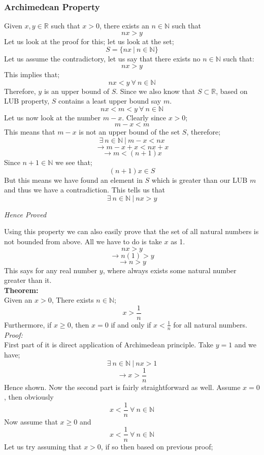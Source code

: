 \documentclass[english,course]{lecture}
\begin{document}
\subsubsection{Archimedean Property}
Given $x,y \in \mathbb{R}$ such that $x > 0$, there exists an $n \in \mathbb{N}$ such that 
$$ nx > y $$
Let us look at the proof for this; let us look at the set;
$$ S = \lbrace nx \ | \ n \in \mathbb{N} \rbrace $$
Let us assume the contradictory, let us say that there exists no $n \in \mathbb{N}$ such that:
$$ nx > y $$
This implies that;
$$ nx < y \ \forall \ n \in \mathbb{N} $$
Therefore, $y$ is an upper bound of $S$. Since we also know that $S \subset \mathbb{R}$, based on LUB property, $S$ contains a least upper bound say $m$.
$$ nx < m < y \ \forall \ n \in \mathbb{N} $$
Let us now look at the number $m-x$. Clearly since $x>0$;
$$ m-x < m $$
This means that $m-x$ is not an upper bound of the set $S$, therefore;
$$ \exists \ n \in \mathbb{N} \ | \ m-x < nx $$
$$ \rightarrow m-x+x < nx+x $$
$$ \rightarrow m < (n+1)x $$
Since $n+1 \in \mathbb{N}$ we see that;
$$ (n+1)x \in S $$
But this means we have found an element in $S$ which is greater than our LUB $m$ and thus we have a contradiction. This tells us that 
$$ \exists \ n \in \mathbb{N} \ | \ nx > y$$
\begin{center}
\emph{Hence Proved}
\end{center}
Using this property we can also easily prove that the set of all natural numbers is not bounded from above. All we have to do is take $x$ as 1.
$$ nx > y $$
$$ \rightarrow n(1) > y $$
$$ \rightarrow n > y $$
This says for any real number $y$, where always exists some natural number greater than it.
\\
\textbf{Theorem:} \\
Given an $x>0$, There exists $n \in \mathbb{N}$;
$$ x > \frac{1}{n}$$
Furthermore, if $x \geq 0$, then $x=0$ if and only if $x < \frac{1}{n}$ for all natural numbers. \\
\textit{Proof:} \\
First part of it is direct application of Archimedean principle. Take $y=1$ and we have;
$$ \exists \ n \in \mathbb{N} \ | \ nx > 1$$
$$ \rightarrow x > \frac{1}{n} $$
Hence shown. Now the second part is fairly straightforward as well. Assume $x=0$, then obviously
$$ x < \frac{1}{n} \ \forall \ n \in \mathbb{N}$$
Now assume that $x \geq 0$ and 
$$ x < \frac{1}{n} \ \forall \ n \in \mathbb{N}$$
Let us try assuming that $x>0$, if so then based on previous proof;
\end{document}
